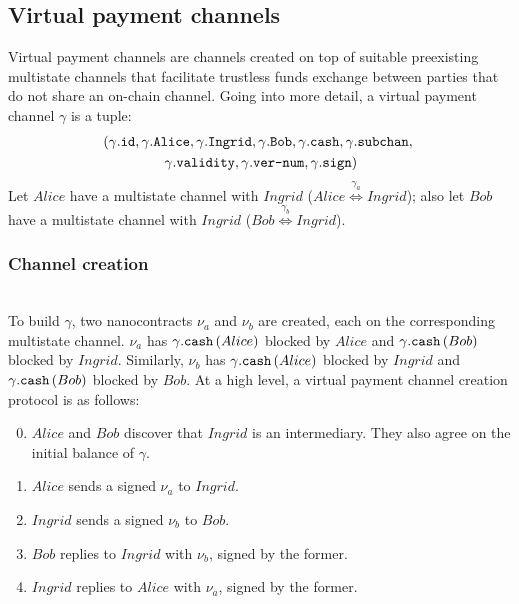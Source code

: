 \subsection{Virtual payment channels}
  Virtual payment channels are channels created on top of suitable preexisting multistate
  channels that facilitate trustless funds exchange between parties that do not share an
  on-chain channel. Going into more detail, a virtual payment channel $\gamma$ is a tuple:
  \begin{gather*}
    \left(\gamma\mbox{.\texttt{id}}, \gamma\mbox{.\texttt{Alice}},
    \gamma\mbox{.\texttt{Ingrid}}, \gamma\mbox{.\texttt{Bob}},
    \gamma\mbox{.\texttt{cash}}, \gamma\mbox{.\texttt{subchan}}, \right. \\
    \left.\gamma\mbox{.\texttt{validity}}, \gamma\mbox{.\texttt{ver-num}},
    \gamma\mbox{.\texttt{sign}}\right)
  \end{gather*}
  Let $Alice$ have a multistate channel with $Ingrid$ ($Alice
  \overset{\gamma_a}{\Leftrightarrow} Ingrid$); also let $Bob$ have a multistate channel
  with $Ingrid$ ($Bob \overset{\gamma_b}{\Leftrightarrow} Ingrid$).

  \subsubsection{Channel creation} \ \\

    To build $\gamma$, two nanocontracts $\nu_a$ and $\nu_b$ are created, each on the
    corresponding multistate channel. $\nu_a$ has
    $\gamma\mbox{.\texttt{cash}}\left(Alice\right)$ blocked by $Alice$ and
    $\gamma\mbox{.\texttt{cash}}\left(Bob\right)$ blocked by $Ingrid$. Similarly, $\nu_b$
    has $\gamma\mbox{.\texttt{cash}}\left(Alice\right)$ blocked by $Ingrid$ and
    $\gamma\mbox{.\texttt{cash}}\left(Bob\right)$ blocked by $Bob$. At a high level, a
    virtual payment channel creation protocol is as follows:
    \begin{enumerate}
    \setcounter{enumi}{-1}
      \item $Alice$ and $Bob$ discover that $Ingrid$ is an intermediary. They also agree
      on the initial balance of $\gamma$.
      \item $Alice$ sends a signed $\nu_a$ to $Ingrid$.
      \item $Ingrid$ sends a signed $\nu_b$ to $Bob$.
      \item $Bob$ replies to $Ingrid$ with $\nu_b$, signed by the former.
      \item $Ingrid$ replies to $Alice$ with $\nu_a$, signed by the former.
    \end{enumerate}

